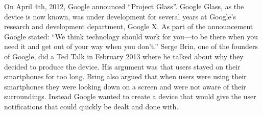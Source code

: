 








On April 4th, 2012, Google announced ``Project Glass''.\cite{GoogleGlassConcept} Google Glass, as the device is now known, was under development for several years at Google's research and development department, Google X. As part of the announcement Google stated:  ``We think technology should work for you---to be there when you need it and get out of your way when you don’t.''\cite{GoogleGlassAnnouncement} Serge Brin, one of the founders of Google, did a Ted Talk in February 2013\cite{tedtalkWhyGlass} where he talked about why they decided to produce the device. His argument was that users stayed on their smartphones for too long. Bring also argued that when users were using their smartphones they were looking down on a screen and were not aware of their surroundings. Instead Google wanted to create a device that would give the user notifications that could quickly be dealt and done with.\\

